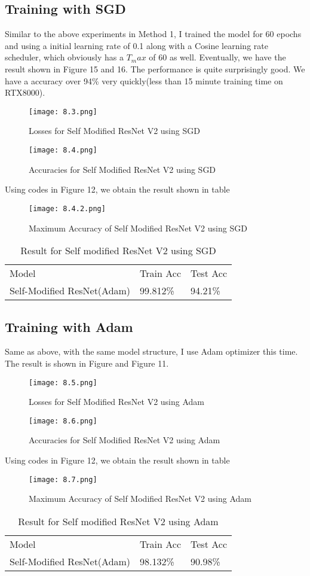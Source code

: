 \documentclass[letterpaper]{article} %
\begin{document}
\subsection{Training with SGD}
Similar to the above experiments in Method 1, I trained the model for 60 epochs and using a initial learning rate of 0.1 along with a Cosine learning rate scheduler, which obviously has a $T_max$ of 60 as well. Eventually, we have the result shown in Figure 15 and 16. The performance is quite surprisingly good. We have a accuracy
over 94\% very quickly(less than 15 minute training time on RTX8000).
\begin{figure}[H]
	\centering
	\texttt{[image: 8.3.png]}
	\caption{Losses for Self Modified ResNet V2 using SGD}
\end{figure}
\begin{figure}[H]
	\centering
	\texttt{[image: 8.4.png]}
	\caption{Accuracies for Self Modified ResNet V2 using SGD}
\end{figure}
Using codes in Figure 12, we obtain the result shown in table
\begin{figure}[H]
	\centering
	\texttt{[image: 8.4.2.png]}
	\caption{Maximum Accuracy of Self Modified ResNet V2 using SGD}
\end{figure}
\begin{table}[H]
	\centering
	\begin{tabular}{l|l|l}
    Model & Train Acc & Test Acc\\
    Self-Modified ResNet(Adam) & 99.812\%  & 94.21\%  \\
	\end{tabular}
	\caption{Result for Self modified ResNet V2 using SGD}
\end{table}
\subsection{Training with Adam}
Same as above, with the same model structure, I use Adam optimizer this time. The result is shown in Figure  and Figure 11.
\begin{figure}[H]
	\centering
	\texttt{[image: 8.5.png]}
	\caption{Losses for Self Modified ResNet V2 using Adam}
\end{figure}
\begin{figure}[H]
	\centering
	\texttt{[image: 8.6.png]}
	\caption{Accuracies for Self Modified ResNet V2 using Adam}
\end{figure}
Using codes in Figure 12, we obtain the result shown in table
\begin{figure}[H]
	\centering
	\texttt{[image: 8.7.png]}
	\caption{Maximum Accuracy of Self Modified ResNet V2 using Adam}
\end{figure}
\begin{table}[H]
	\centering
	\begin{tabular}{l|l|l}
    Model & Train Acc & Test Acc\\
    Self-Modified ResNet(Adam) & 98.132\%  & 90.98\%  \\
	\end{tabular}
	\caption{Result for Self modified ResNet V2 using Adam}
\end{table}
\end{document}

